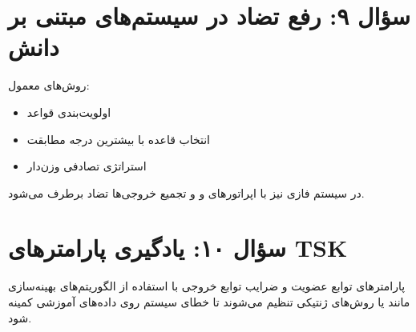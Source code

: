 \documentclass[12pt,a4paper]{article}
\begin{document}
	\section*{سؤال ۹: رفع تضاد در سیستم‌های مبتنی بر دانش}
	روش‌های معمول:
	\begin{itemize}
		\item اولویت‌بندی قواعد
		\item انتخاب قاعده با بیشترین درجه مطابقت
		\item استراتژی تصادفی وزن‌دار
	\end{itemize}
	در سیستم فازی نیز با اپراتورهای  و  و تجمیع خروجی‌ها تضاد برطرف می‌شود.
	
	\section*{سؤال ۱۰: یادگیری پارامترهای TSK}
	پارامترهای توابع عضویت و ضرایب توابع خروجی با استفاده از الگوریتم‌های بهینه‌سازی مانند  یا روش‌های ژنتیکی تنظیم می‌شوند تا خطای سیستم روی داده‌های آموزشی کمینه شود.
	
\end{document}
